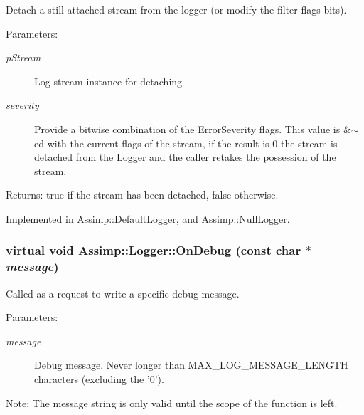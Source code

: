 Detach a still attached stream from the logger (or modify the filter flags bits). 

\begin{Desc}
\item[Parameters:]
\begin{description}
\item[{\em pStream}]Log-stream instance for detaching \item[{\em severity}]Provide a bitwise combination of the ErrorSeverity flags. This value is \&$\sim$ed with the current flags of the stream, if the result is 0 the stream is detached from the \hyperlink{class_assimp_1_1_logger}{Logger} and the caller retakes the possession of the stream. \end{description}
\end{Desc}
\begin{Desc}
\item[Returns:]true if the stream has been detached, false otherwise. \end{Desc}


Implemented in \hyperlink{class_assimp_1_1_default_logger_2615f1d1624f1d742d0cf2dd4a5cccc8}{Assimp::DefaultLogger}, and \hyperlink{class_assimp_1_1_null_logger_b49b14a0045aab73b813a448b5aa77b4}{Assimp::NullLogger}.\hypertarget{class_assimp_1_1_logger_ded6996d20f14204877097b88bd5eac6}{
\subsubsection[OnDebug]{\setlength{\rightskip}{0pt plus 5cm}virtual void Assimp::Logger::OnDebug (const char $\ast$ {\em message})}}
\label{class_assimp_1_1_logger_ded6996d20f14204877097b88bd5eac6}


Called as a request to write a specific debug message. 

\begin{Desc}
\item[Parameters:]
\begin{description}
\item[{\em message}]Debug message. Never longer than MAX\_\-LOG\_\-MESSAGE\_\-LENGTH characters (excluding the '0'). \end{description}
\end{Desc}
\begin{Desc}
\item[Note:]The message string is only valid until the scope of the function is left. \end{Desc}


